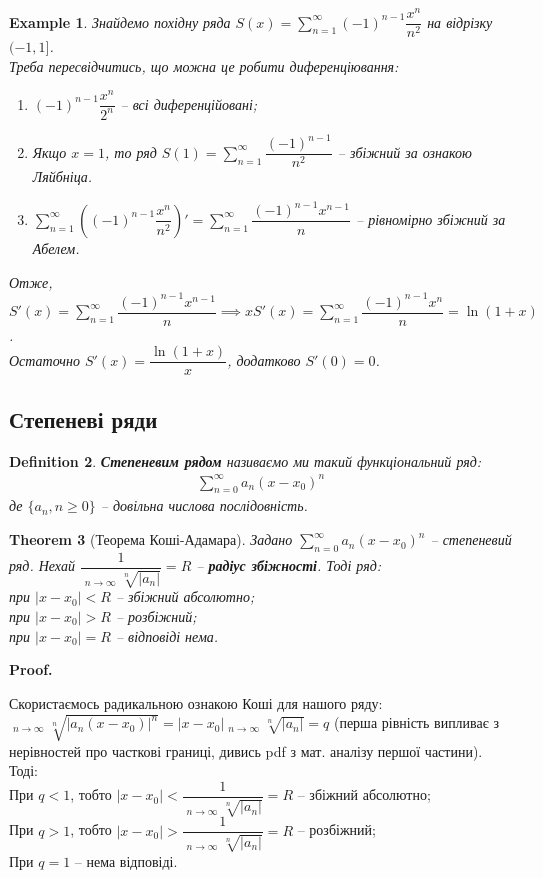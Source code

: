 \documentclass[a4paper, 10pt]{article}
\makeatletter
\DeclareMathOperator*\uplim{\overline{lim}}
\def\huge{\displaystyle}
\def\qed{$\blacksquare$}
\theoremstyle{theoremdd}
\newtheorem{theorem}{Theorem}[subsection]
\theoremstyle{theoremdd}
\theoremstyle{theoremdd}
\newtheorem{definition}[theorem]{Definition}
\theoremstyle{theoremdd}
\theoremstyle{theoremdd}
\newtheorem{example}[theorem]{Example}
\theoremstyle{theoremdd}
\theoremstyle{theoremdd}
\theoremstyle{theoremdd}
\theoremstyle{theoremdd}
\renewenvironment{proof}[1][Proof.\\]{\par
\pushQED{\hfill \qed}%
\normalfont \topsep6\p@\@plus6\p@\relax
\trivlist
\item\relax
{\bfseries
#1\@addpunct{.}}\hspace\labelsep\ignorespaces
}{%
\popQED\endtrivlist\@endpefalse
}
\makeatother
\begin{document}
\begin{example}
Знайдемо похідну ряда $S(x) = \huge\sum_{n=1}^\infty (-1)^{n-1}\dfrac{x^n}{n^2}$ на відрізку $(-1,1]$.\\
Треба пересвідчитись, що можна це робити диференціювання:
\begin{enumerate}[nosep,wide=0pt,label={\arabic*)}]
\item $(-1)^{n-1}\dfrac{x^n}{2^n}$ -- всі диференційовані;
\item Якщо $x = 1$, то ряд $S(1) = \huge\sum_{n=1}^\infty \dfrac{(-1)^{n-1}}{n^2}$ -- збіжний за ознакою Ляйбніца.
\item $\huge\sum_{n=1}^\infty \left( (-1)^{n-1}\dfrac{x^n}{n^2} \right)' = \huge\sum_{n=1}^\infty \dfrac{(-1)^{n-1}x^{n-1}}{n}$ -- рівномірно збіжний за Абелем.
\end{enumerate}
Отже, $S'(x) = \huge\sum_{n=1}^\infty \dfrac{(-1)^{n-1} x^{n-1}}{n} \implies x S'(x) = \sum_{n=1}^\infty \dfrac{(-1)^{n-1}x^n}{n} = \ln (1+x)$.\\
Остаточно $S'(x) = \dfrac{\ln(1+x)}{x}$, додатково $S'(0) = 0$.
\end{example}

\subsection{Степеневі ряди}
\begin{definition}
\textbf{Степеневим рядом} називаємо ми такий функціональний ряд:
\begin{align*}
\sum_{n=0}^\infty a_n(x-x_0)^n
\end{align*}
де $\{a_n, n \geq 0\}$ -- довільна числова послідовність.
\end{definition}

\begin{theorem}[Теорема Коші-Адамара]
Задано $\huge \sum_{n=0}^\infty a_n(x-x_0)^n$ -- степеневий ряд. Нехай $\dfrac{1}{\huge \uplim_{n \to \infty} \sqrt[n]{|a_n|}} = R$ -- \textbf{радіус збіжності}. Тоді ряд:\\
при $|x-x_0|<R$ -- збіжний абсолютно;\\
при $|x-x_0|>R$ -- розбіжний;\\
при $|x-x_0|=R$ -- відповіді нема.
\end{theorem}

\begin{proof}
Скористаємось радикальною ознакою Коші для нашого ряду:\\
$\huge \uplim_{n \to \infty} \sqrt[n]{|a_n(x-x_0)|^n} = |x-x_0| \uplim_{n \to \infty} \sqrt[n]{|a_n|} = q$ (перша рівність випливає з нерівностей про часткові границі, дивись pdf з мат. аналізу першої частини). Тоді:\\
При $q < 1$, тобто $|x-x_0| < \dfrac{1}{\huge \uplim_{n \to \infty} \sqrt[n]{|a_n|}} = R$ -- збіжний абсолютно;\\
При $q > 1$, тобто $|x-x_0| > \dfrac{1}{\huge \uplim_{n \to \infty} \sqrt[n]{|a_n|}} = R$ -- розбіжний;\\
При $q = 1$ -- нема відповіді.
\end{proof}
\end{document}
